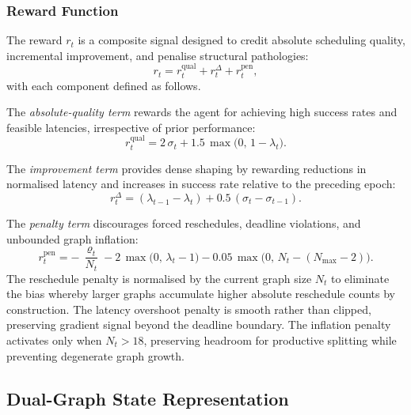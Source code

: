 \subsubsection*{Reward Function}

The reward $r_t$ is a composite signal designed to credit
absolute scheduling quality, incremental improvement, and
penalise structural pathologies:
\begin{equation}
  r_t = r_t^{\mathrm{qual}}
      + r_t^{\Delta}
      + r_t^{\mathrm{pen}},
  \label{eq:reward}
\end{equation}
with each component defined as follows.

The \textit{absolute-quality term} rewards the agent for achieving
high success rates and feasible latencies, irrespective of prior
performance:
\begin{equation}
  r_t^{\mathrm{qual}} =
    2\,\sigma_t + 1.5\,\max\!\bigl(0,\,1-\lambda_t\bigr).
  \label{eq:r_qual}
\end{equation}

The \textit{improvement term} provides dense shaping by rewarding
reductions in normalised latency and increases in success rate
relative to the preceding epoch:
\begin{equation}
  r_t^{\Delta} =
    (\lambda_{t-1} - \lambda_t)
    + 0.5\,(\sigma_t - \sigma_{t-1}).
  \label{eq:r_delta}
\end{equation}

The \textit{penalty term} discourages forced reschedules,
deadline violations, and unbounded graph inflation:
\begin{equation}
  r_t^{\mathrm{pen}} =
    -\,\frac{\varrho_t}{N_t}
    - 2\,\max\!\bigl(0,\,\lambda_t - 1\bigr)
    - 0.05\,\max\!\bigl(0,\,N_t - (N_{\max}-2)\bigr).
  \label{eq:r_pen}
\end{equation}
The reschedule penalty is normalised by the current graph size $N_t$
to eliminate the bias whereby larger graphs accumulate higher absolute
reschedule counts by construction.
The latency overshoot penalty is smooth rather than clipped,
preserving gradient signal beyond the deadline boundary.
The inflation penalty activates only when $N_t > 18$, preserving
headroom for productive splitting while preventing degenerate
graph growth.

\subsection{Dual-Graph State Representation}
\label{subsec:gnn}

